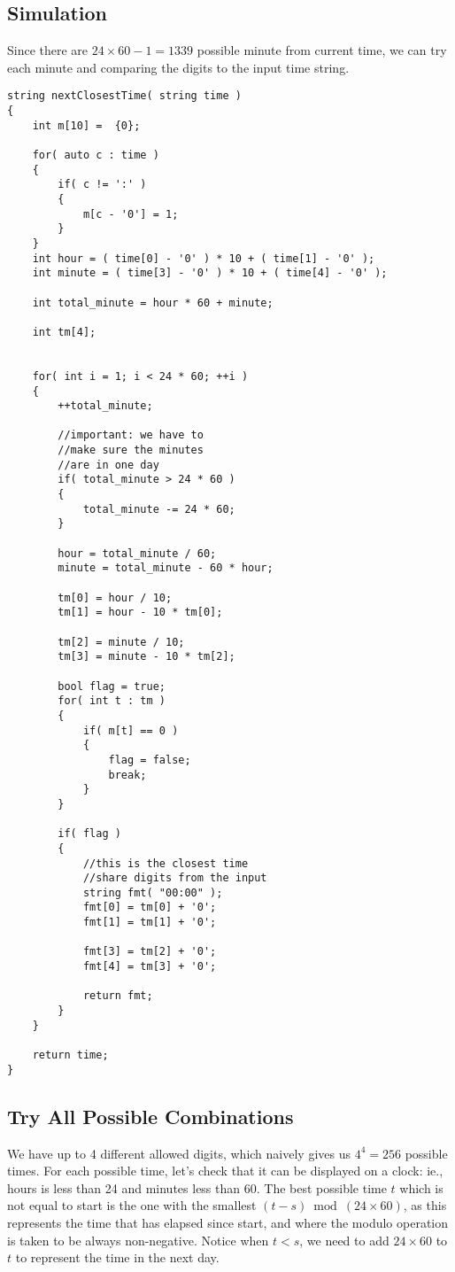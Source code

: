 \subsection{Simulation}
Since there are $24 \times 60-1=1339$ possible minute from current time, we can try each minute and comparing the digits to the input time string.

\setcounter{lstlisting}{0}
\begin{lstlisting}[style=customc, caption={Simulation}]
string nextClosestTime( string time )
{
    int m[10] =  {0};

    for( auto c : time )
    {
        if( c != ':' )
        {
            m[c - '0'] = 1;
        }
    }
    int hour = ( time[0] - '0' ) * 10 + ( time[1] - '0' );
    int minute = ( time[3] - '0' ) * 10 + ( time[4] - '0' );

    int total_minute = hour * 60 + minute;

    int tm[4];


    for( int i = 1; i < 24 * 60; ++i )
    {
        ++total_minute;

        //important: we have to
        //make sure the minutes
        //are in one day
        if( total_minute > 24 * 60 )
        {
            total_minute -= 24 * 60;
        }

        hour = total_minute / 60;
        minute = total_minute - 60 * hour;

        tm[0] = hour / 10;
        tm[1] = hour - 10 * tm[0];

        tm[2] = minute / 10;
        tm[3] = minute - 10 * tm[2];

        bool flag = true;
        for( int t : tm )
        {
            if( m[t] == 0 )
            {
                flag = false;
                break;
            }
        }

        if( flag )
        {
            //this is the closest time
            //share digits from the input
            string fmt( "00:00" );
            fmt[0] = tm[0] + '0';
            fmt[1] = tm[1] + '0';

            fmt[3] = tm[2] + '0';
            fmt[4] = tm[3] + '0';

            return fmt;
        }
    }

    return time;
}
\end{lstlisting}

\subsection{Try All Possible Combinations}
We have up to 4 different allowed digits, which naively gives us $4^4=256$ possible times. For each possible time, let's check that it can be displayed on a clock: ie., hours is less than 24 and minutes less than 60. The best possible time $t$ which is not equal to start is the one with the smallest $ (t - s)\bmod  (24 \times 60)$, as this represents the time that has elapsed since start, and where the modulo operation is taken to be always non-negative. Notice when $t < s$, we need to add $24\times 60$ to $t$ to represent the time in the next day.

